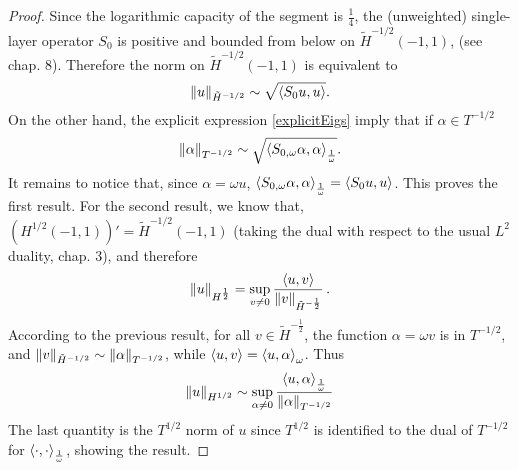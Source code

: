\documentclass[a4paper]{article}
\begin{document}
\begin{proof}
	Since the logarithmic capacity of the segment is $\frac{1}{4}$, the (unweighted) single-layer operator $S_0$ is positive and bounded from below on $\tilde{H}^{-1/2}(-1,1)$, (see \cite{mclean2000strongly} chap. 8). Therefore the norm on $\tilde{H}^{-1/2}(-1,1)$ is equivalent to 
	\[\left\|u\right\|_{\tilde{H}^{-1/2}} \sim \sqrt{\left\langle S_0u,u\right\rangle}.\]
	On the other hand, the explicit expression \eqref{explicitEigs} imply that if $\alpha\in T^{-1/2}$
	\[ \left\|\alpha\right\|_{T^{-1/2}} \sim \sqrt{\left\langle S_{0,\omega} \alpha,\alpha\right\rangle_\frac{1}{\omega}}.\]
	It remains to notice that, since $\alpha=\omega u$, $\left\langle S_{0,\omega} \alpha,\alpha\right\rangle_\frac{1}{\omega} = \left\langle S_0u,u\right\rangle$. This proves the first result. For the second result, we know that, $(H^{1/2}(-1,1))' =  \tilde{H}^{-1/2}(-1,1)$ (taking the dual with respect to the usual $L^2$ duality, \cite{mclean1986spectral} chap. 3), and therefore
	\[\left\|u\right\|_{H^{\frac{1}{2}}} = \sup_{ v\neq 0} \dfrac{\left\langle u,v\right\rangle}{\left\|v\right\|_{\tilde{H}^{-\frac{1}{2}}}}\,.\]
	According to the previous result, for all $v\in \tilde{H}^{-\frac{1}{2}}$, the function $\alpha = \omega v$ is in $T^{-1/2}$, and $\left\| v\right\|_{\tilde{H}^{-1/2}} \sim \left\|\alpha\right\|_{T^{-1/2}}$, while $\left\langle u,v\right\rangle = \left\langle u,\alpha\right\rangle_\omega$. Thus 
	\[\left\|u\right\|_{H^{1/2}} \sim \sup_{\alpha \neq 0} \dfrac{\left\langle u,\alpha\right\rangle_\frac{1}{\omega}}{\left\|\alpha\right\|_{T^{-1/2}}}\]
	The last quantity is the $T^{1/2}$ norm of $u$ since $T^{1/2}$ is identified to the dual of $T^{-1/2}$ for $\left\langle \cdot,\cdot\right\rangle_\frac{1}{\omega}$, showing the result. 
\end{proof}
\end{document}
